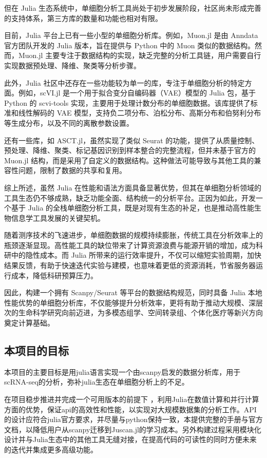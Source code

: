但在 Julia 生态系统中，单细胞分析工具尚处于初步发展阶段，社区尚未形成完善的支持体系，第三方库的数量和功能也相对有限。

目前，Julia 平台上已有一些小型的单细胞分析库。例如，Muon.jl 是由 Anndata 官方团队开发的 Julia 版本，旨在提供与 Python 中的 Muon 类似的数据结构。然而，Muon.jl 主要专注于数据结构的实现，缺乏完整的分析工具链，用户需要自行实现数据预处理、降维、聚类等分析步骤。

此外，Julia 社区中还存在一些功能较为单一的库，专注于单细胞分析的特定方面。例如，scVI.jl 是一个用于拟合变分自编码器（VAE）模型的 Julia 包，基于 Python 的 scvi-tools 实现，主要用于处理计数分布的单细胞数据。该库提供了标准和线性解码的 VAE 模型，支持负二项分布、泊松分布、高斯分布和伯努利分布等生成分布，以及不同的离散参数设置。

还有一些库，如 ASCT.jl，虽然实现了类似 Seurat 的功能，提供了从质量控制、预处理、降维、聚类、标记基因识别到样本整合的完整流程，但并未基于官方的 Muon.jl 结构，而是采用了自定义的数据结构。这种做法可能导致与其他工具的兼容性问题，限制了数据的共享和复用。

综上所述，虽然 Julia 在性能和语法方面具备显著优势，但其在单细胞分析领域的工具生态仍不够成熟，缺乏功能全面、结构统一的分析平台。正因为如此，开发一个基于 Julia 的全栈单细胞分析工具，既是对现有生态的补足，也是推动高性能生物信息学工具发展的关键契机。

随着测序技术的飞速进步，单细胞数据的规模持续膨胀，传统工具在分析效率上的瓶颈逐渐显现。高性能工具的缺位带来了计算资源浪费与能源开销的增加，成为科研中的隐性成本。而 Julia 所带来的运行效率提升，不仅可以缩短实验周期，加快结果反馈，有助于快速迭代实验与建模，也意味着更低的资源消耗，节省服务器运行成本，降低科研预算压力。

因此，构建一个拥有 Scanpy/Seurat 等平台的数据结构规范，同时具备 Julia 本地性能优势的单细胞分析库，不仅能够提升分析效率，更将有助于推动大规模、深层次的生命科学研究向前迈进，为多模态组学、空间转录组、个体化医疗等新兴方向奠定计算基础。

\subsection{本项目的目标}

本项目的主要目标是用julia语言实现一个由scanpy启发的数据分析库，用于scRNA-seq的分析，弥补julia生态在单细胞分析上的不足。

在项目稳步推进并完成一个可用版本的前提下 ，利用Julia在数值计算和并行计算方面的优势，保证api的高效性和性能，以实现对大规模数据集的分析工作。API的设计应符合julia官方要求，并尽量与python保持一致，本提供完整的手册与官方文档，以降低用户从scanpy迁移到Juscan.jl的学习成本。另外构建过程采用模块化设计并与Julia生态中的其他工具无缝对接，在提高代码的可读性的同时方便未来的迭代并集成更多高级功能。

